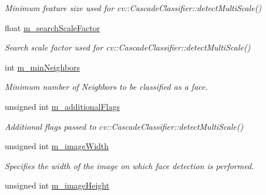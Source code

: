 \begin{DoxyCompactItemize}
\begin{DoxyCompactList}\small\item\em Minimum feature size used for cv\-::\-Cascade\-Classifier\-::detect\-Multi\-Scale() \end{DoxyCompactList}\item 
\hypertarget{class_face_tracker_adb6ffd8a79a458cb701b39616e89e593}{float \hyperlink{class_face_tracker_adb6ffd8a79a458cb701b39616e89e593}{m\-\_\-search\-Scale\-Factor}}\label{class_face_tracker_adb6ffd8a79a458cb701b39616e89e593}

\begin{DoxyCompactList}\small\item\em Search scale factor used for cv\-::\-Cascade\-Classifier\-::detect\-Multi\-Scale() \end{DoxyCompactList}\item 
\hypertarget{class_face_tracker_a939f87b9f2cb592530ed10007f260ea0}{int \hyperlink{class_face_tracker_a939f87b9f2cb592530ed10007f260ea0}{m\-\_\-min\-Neighbors}}\label{class_face_tracker_a939f87b9f2cb592530ed10007f260ea0}

\begin{DoxyCompactList}\small\item\em Minimum number of Neighbors to be classified as a face. \end{DoxyCompactList}\item 
\hypertarget{class_face_tracker_a20e60ee13a0d72915c5cd911fb551b25}{unsigned int \hyperlink{class_face_tracker_a20e60ee13a0d72915c5cd911fb551b25}{m\-\_\-additional\-Flags}}\label{class_face_tracker_a20e60ee13a0d72915c5cd911fb551b25}

\begin{DoxyCompactList}\small\item\em Additional flags passed to cv\-::\-Cascade\-Classifier\-::detect\-Multi\-Scale() \end{DoxyCompactList}\item 
\hypertarget{class_face_tracker_a20746a9ea5b6c90677fc776120b761d1}{unsigned int \hyperlink{class_face_tracker_a20746a9ea5b6c90677fc776120b761d1}{m\-\_\-image\-Width}}\label{class_face_tracker_a20746a9ea5b6c90677fc776120b761d1}

\begin{DoxyCompactList}\small\item\em Specifies the width of the image on which face detection is performed. \end{DoxyCompactList}\item 
\hypertarget{class_face_tracker_a2e35b6c5399c821e2c2ae5f4403f8c43}{unsigned int \hyperlink{class_face_tracker_a2e35b6c5399c821e2c2ae5f4403f8c43}{m\-\_\-image\-Height}}\label{class_face_tracker_a2e35b6c5399c821e2c2ae5f4403f8c43}


\end{DoxyCompactItemize}

